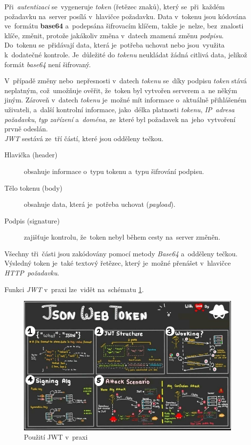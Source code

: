 \documentclass[11pt,a4paper]{report}
\begin{document}
                Při~\emph{autentizaci} se~vygeneruje \emph{token} (řetězec znaků), který se~při~každém požadavku na~server posílá v~hlavičce požadavku. Data v~tokenu jsou kódována ve~formátu \textbf{base64} a~podepsána šifrovacím klíčem, takže je~nelze, bez~znalosti klíče, změnit, protože jakákoliv změna v~datech znamená změnu \emph{podpisu}. Do~tokenu se~přidávají data, která je~potřeba uchovat nebo jsou~využita k~dodatečné kontrole. Je~důležité do \emph{tokenu} neukládat žádná citlivá data, jelikož formát \emph{base64} není šifrovaný. 
                
                V~případě změny nebo~nepřesnosti v~datech \emph{tokenu} se~díky podpisu \emph{token} stává neplatným, což~umožňuje ověřit, že~token byl vytvořen serverem a~ne někým jiným. Zároveň v~datech \emph{tokenu} je~možné mít informace o~aktuálně přihlášeném uživateli, a~další kontrolní informace, jako~délka platnosti \emph{tokenu}, \emph{IP~adresa požadavku}, \emph{typ zařízení} a~\emph{doména}, ze~které byl požadavek na~jeho~vytvoření prvně odeslán.\\

                \emph{JWT} sestává ze~tří částí, které jsou odděleny tečkou.
                
                \begin{description}
                    \item[Hlavička (header)] obsahuje informace o~typu tokenu a~typu šifrování podpisu.
                    \item[Tělo tokenu (body)] obsahuje data, která je~potřeba uchovat (\emph{payload}).
                    \item[Podpis (signature)] zajišťuje kontrolu, že~token nebyl během cesty na~server změněn.
                \end{description}

                Všechny tři~části jsou zakódovány pomocí metody \emph{Base64} a~odděleny tečkou. Výsledný token je~také textový řetězec, který je~možné přenášet v~hlavičce \emph{HTTP~požadavku}.

                Funkci \emph{JWT} v~praxi lze~vidět na~schématu \ref{model-jwt}.

                \begin{figure}
                    \centering
                    \includegraphics[width=.9\linewidth]{./files/img/jwt.jpg}
                    \caption{Použití JWT v~praxi}
                    \label{model-jwt}
                \end{figure}
\end{document}
